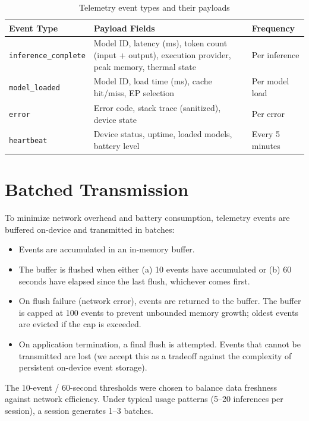 \documentclass[12pt, letterpaper, twoside]{report}
\begin{document}
\begin{table}[H]
\centering
\caption{Telemetry event types and their payloads}
\label{tab:event_types}
\begin{tabularx}{\textwidth}{@{}lXl@{}}
\toprule
\textbf{Event Type} & \textbf{Payload Fields} & \textbf{Frequency} \\
\midrule
\texttt{inference\_complete} & Model ID, latency (ms), token count (input + output), execution provider, peak memory, thermal state & Per inference \\
\texttt{model\_loaded} & Model ID, load time (ms), cache hit/miss, EP selection & Per model load \\
\texttt{error} & Error code, stack trace (sanitized), device state & Per error \\
\texttt{heartbeat} & Device status, uptime, loaded models, battery level & Every 5 minutes \\
\bottomrule
\end{tabularx}
\end{table}

\section{Batched Transmission}
\label{sec:batched_telemetry}

To minimize network overhead and battery consumption, telemetry events are buffered on-device and transmitted in batches:

\begin{itemize}[itemsep=1pt, topsep=2pt, parsep=0pt]
\item Events are accumulated in an in-memory buffer.
\item The buffer is flushed when either (a) 10 events have accumulated or (b) 60 seconds have elapsed since the last flush, whichever comes first.
\item On flush failure (network error), events are returned to the buffer. The buffer is capped at 100 events to prevent unbounded memory growth; oldest events are evicted if the cap is exceeded.
\item On application termination, a final flush is attempted. Events that cannot be transmitted are lost (we accept this as a tradeoff against the complexity of persistent on-device event storage).
\end{itemize}

The 10-event / 60-second thresholds were chosen to balance data freshness against network efficiency. Under typical usage patterns (5--20 inferences per session), a session generates 1--3 batches.
\end{document}
